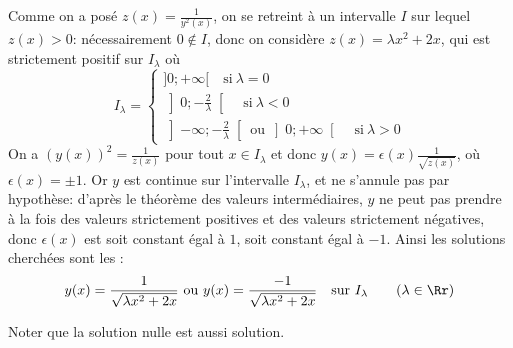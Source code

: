 {\begin{enumerate}
{    Comme on a posé $z(x) = \frac{1}{y^2(x)}$, on se retreint à un intervalle $I$ sur lequel $z(x)>0$: nécessairement $0\notin I$, donc on considère $z(x)=\lambda x^2+2x$, qui est strictement positif sur $I_\lambda$ où
$$I_\lambda=\begin{cases}
]0;+\infty[\quad\text{si}\ \lambda=0\\
\left]0;-\frac{2}{\lambda}\right[\quad\text{si}\ \lambda<0\\
\left]-\infty;-\frac{2}{\lambda}\right[\ \mathrm{ou}\ \left]0;+\infty\right[\quad\text{si}\ \lambda>0              
            \end{cases}
$$
On a $(y(x))^2 = \frac{1}{z(x)}$ pour tout $x\in I_\lambda$ et donc  $y(x) = \epsilon(x)\frac{1}{\sqrt{z(x)}}$, 
où $\epsilon(x)=\pm 1$. Or $y$ est continue sur l'intervalle $I_\lambda$, et 
ne s'annule pas par hypothèse: d'après le théorème des valeurs intermédiaires, $y$ 
ne peut pas prendre à la fois des valeurs strictement positives et des valeurs 
strictement négatives, donc $\epsilon(x)$ est soit constant égal à $1$, soit constant égal à $-1$.
    Ainsi les solutions cherchées sont les :
    $$y(x) = \frac{1}{\sqrt{\lambda x^2 + 2x}}\ \mathrm{ou}\ y(x) = \frac{-1}{\sqrt{\lambda x^2 + 2x}}\quad\mathrm{sur}\ I_\lambda\qquad (\lambda\in \Rr)$$
    
    Noter que la solution nulle est aussi solution.}
\end{enumerate}
}
